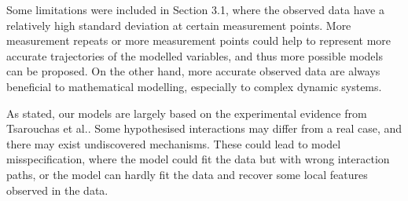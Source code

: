 


Some limitations were included in Section 3.1, where the observed data have a relatively high standard deviation at certain measurement points. More measurement repeats or more measurement points could help to represent more accurate trajectories of the modelled variables, and thus more possible models can be proposed. On the other hand, more accurate observed data are always beneficial to mathematical modelling, especially to complex dynamic systems.

As stated, our models are largely based on the experimental evidence from Tsarouchas et al.\cite{ref:Tsarouchas}. Some hypothesised interactions may differ from a real case, and there may exist undiscovered mechanisms. These could lead to model misspecification, where the model could fit the data but with wrong interaction paths, or the model can hardly fit the data and recover some local features observed in the data.















